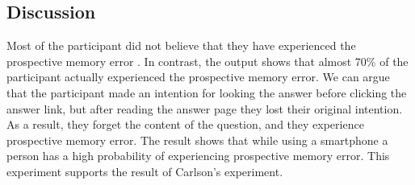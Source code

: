 \subsection{Discussion}

Most of the participant did not believe that they have experienced the prospective memory error
. In contrast, the output shows that  almost 70\% of the participant actually experienced the prospective memory error.
We can argue that the participant made an intention for looking the answer before clicking the answer link, but after reading the answer page
they lost their original intention.
As a result, they forget the content of the question, and they experience prospective memory error.
The result shows that while using a smartphone a person has a high probability of experiencing prospective memory error.
This experiment supports the result of Carlson's experiment.



